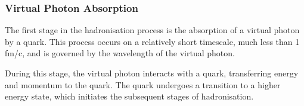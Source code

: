 \subsubsection{Virtual Photon Absorption}
\label{sssec::virtual_photon_absorption}
    The first stage in the hadronisation process is the absorption of a virtual photon by a quark.
    This process occurs on a relatively short timescale, much less than 1 fm/c, and is governed by the wavelength of the virtual photon.

    During this stage, the virtual photon interacts with a quark, transferring energy and momentum to the quark.
    The quark undergoes a transition to a higher energy state, which initiates the subsequent stages of hadronisation.
